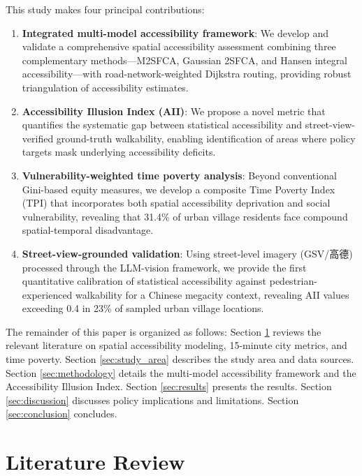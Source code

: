 \documentclass[preprint,12pt,authoryear]{elsarticle}
\begin{document}
This study makes four principal contributions:

\begin{enumerate}
    \item \textbf{Integrated multi-model accessibility framework}: We develop and validate a comprehensive spatial accessibility assessment combining three complementary methods---M2SFCA, Gaussian 2SFCA, and Hansen integral accessibility---with road-network-weighted Dijkstra routing, providing robust triangulation of accessibility estimates.
    
    \item \textbf{Accessibility Illusion Index (AII)}: We propose a novel metric that quantifies the systematic gap between statistical accessibility and street-view-verified ground-truth walkability, enabling identification of areas where policy targets mask underlying accessibility deficits.
    
    \item \textbf{Vulnerability-weighted time poverty analysis}: Beyond conventional Gini-based equity measures, we develop a composite Time Poverty Index (TPI) that incorporates both spatial accessibility deprivation and social vulnerability, revealing that 31.4\% of urban village residents face compound spatial-temporal disadvantage.
    
    \item \textbf{Street-view-grounded validation}: Using street-level imagery (GSV/高德) processed through the LLM-vision framework, we provide the first quantitative calibration of statistical accessibility against pedestrian-experienced walkability for a Chinese megacity context, revealing AII values exceeding 0.4 in 23\% of sampled urban village locations.
\end{enumerate}

The remainder of this paper is organized as follows: Section \ref{sec:literature} reviews the relevant literature on spatial accessibility modeling, 15-minute city metrics, and time poverty. Section \ref{sec:study_area} describes the study area and data sources. Section \ref{sec:methodology} details the multi-model accessibility framework and the Accessibility Illusion Index. Section \ref{sec:results} presents the results. Section \ref{sec:discussion} discusses policy implications and limitations. Section \ref{sec:conclusion} concludes.

\section{Literature Review}
\label{sec:literature}
\end{document}
